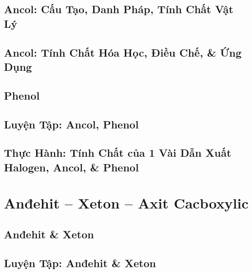 \documentclass[oneside]{book}
\numberwithin{equation}{section}
\begin{document}

\section{Ancol: Cấu Tạo, Danh Pháp, Tính Chất Vật Lý}


\section{Ancol: Tính Chất Hóa Học, Điều Chế, \& Ứng Dụng}


\section{Phenol}


\section{Luyện Tập: Ancol, Phenol}


\section{Thực Hành: Tính Chất của 1 Vài Dẫn Xuất Halogen, Ancol, \& Phenol}


\chapter{Anđehit -- Xeton -- Axit Cacboxylic}

\section{Anđehit \& Xeton}


\section{Luyện Tập: Anđehit \& Xeton}
\end{document}
